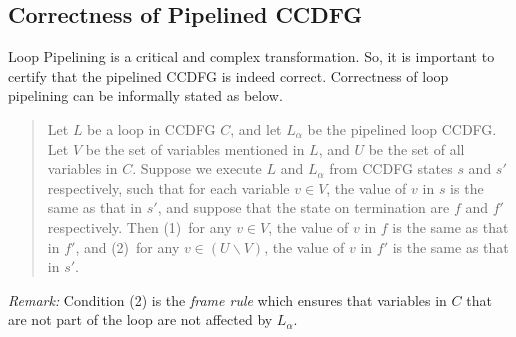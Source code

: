\subsection{Correctness of Pipelined CCDFG}
\label{subsec:correctness-defn}

Loop Pipelining is a critical and complex transformation. So, it is important to certify that the pipelined CCDFG is indeed correct. Correctness of loop pipelining can be informally stated as below.

\begin{quote}
Let $L$ be a loop in CCDFG $C$, and let $L_{\alpha}$ be the
pipelined loop CCDFG. Let $V$ be the set of
variables mentioned in $L$, and $U$ be the set of all
variables in $C$.  Suppose we execute $L$ and $L_{\alpha}$
from CCDFG states $s$ and $s'$ respectively, such that for
each variable $v\in V$, the value of $v$ in $s$ is the same
as that in $s'$, and suppose that the state on termination
are $f$ and $f'$ respectively.  Then (1)~for any $v\in V$,
the value of $v$ in $f$ is the same as that in $f'$, and
(2)~for any $v\in(U\backslash V)$, the value of $v$ in $f'$
is the same as that in $s'$.
\end{quote}
\noindent
{\em Remark:} Condition (2) is the {\em frame rule} which
ensures that variables in $C$ that are not part of the loop
are not affected by $L_{\alpha}$.

